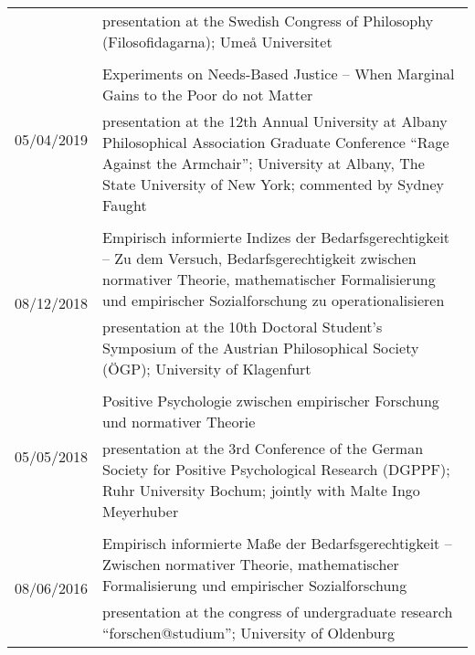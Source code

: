 \documentclass[a4paper,10pt]{article}
\begin{document}
\begin{longtable}{p{2.25cm}p{11cm}}
& \footnotesize{presentation at the Swedish Congress of Philosophy (Filosofidagarna); Umeå Universitet}\\
\\
\multirow{2}{2.25cm}{\footnotesize{05/04/2019}} & Experiments on Needs-Based Justice -- When Marginal Gains to the Poor do not Matter\\
& \footnotesize{presentation at the 12th Annual University at Albany Philosophical Association Graduate Conference \enquote{Rage Against the Armchair}; University at Albany, The State University of New York; commented by Sydney Faught}\\
\\
\multirow{2}{2.25cm}{\footnotesize{08/12/2018}} & Empirisch informierte Indizes der Bedarfsgerechtigkeit -- Zu dem Versuch, Bedarfsgerechtigkeit zwischen normativer Theorie, mathematischer Formalisierung und empirischer Sozialforschung zu operationalisieren\\
& \footnotesize{presentation at the 10th Doctoral Student's Symposium of the Austrian Philosophical Society (ÖGP); University of Klagenfurt}\\
\\
\multirow{2}{2.25cm}{\footnotesize{05/05/2018}} & Positive Psychologie zwischen empirischer Forschung und normativer Theorie\\
& \footnotesize{presentation at the 3rd Conference of the German Society for Positive Psychological Research (DGPPF); Ruhr University Bochum; jointly with Malte Ingo Meyerhuber}\\
\\
\multirow{2}{2.25cm}{\footnotesize{08/06/2016}} & Empirisch informierte Maße der Bedarfsgerechtigkeit -- Zwischen normativer Theorie, mathematischer Formalisierung und empirischer Sozialforschung\\
& \footnotesize{presentation at the congress of undergraduate research \enquote{forschen@studium}; University of Oldenburg}\\
\end{longtable}

\clearpage %
\end{document}
